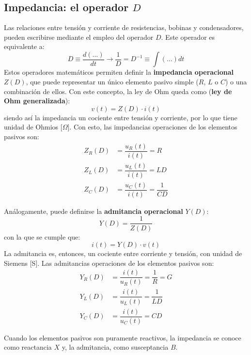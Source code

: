 \documentclass[11pt]{book} %
\begin{document}
		\subsection{Impedancia: el operador $D$ }\label{sec.operador_D}
	Las relaciones entre tensión y corriente de resistencias, bobinas y condensadores, pueden escribirse mediante el empleo del operador $D$. Este operador es equivalente a:
	\begin{equation*}
		D\equiv \dfrac{d(...)}{dt} \rightarrow \dfrac{1}{D}=D^{-1}\equiv \int (...) dt
	\end{equation*}
	Estos operadores matemáticos permiten definir la \textbf{impedancia operacional} $Z(D)$, que puede representar un único elemento pasivo simple ($R$, $L$ o $C$) o una combinación de ellos. Con este concepto, la ley de Ohm queda como (\textbf{ley de Ohm generalizada}):
	\begin{equation*}
		v(t)=Z(D)\cdot i(t)
	\end{equation*}
	siendo así la impedancia un cociente entre tensión y corriente, por lo que tiene unidad de Ohmios [$\Omega$].  Con esto, las impedancias operaciones de los elementos pasivos son: 
	\begin{align*}
		Z_R(D)&=\dfrac{u_R(t)}{i(t)}=R\\
		Z_L(D)&=\dfrac{u_L(t)}{i(t)}=LD\\
		Z_C(D)&=\dfrac{u_C(t)}{i(t)}=\dfrac{1}{CD}
	\end{align*}
	
	Análogamente, puede definirse la \textbf{admitancia operacional} $Y(D)$:
	\begin{equation*}
		Y(D)=\dfrac{1}{Z(D)}
	\end{equation*}
	con la que se cumple que:
	\begin{equation*}
		i(t)=Y(D)\cdot v(t)
	\end{equation*}
	La admitancia es, entonces, un cociente entre corriente y tensión, con unidad de Siemens [S]. Las admitancias operaciones de los elementos pasivos son: 
	\begin{align*}
		Y_R(D)&=\dfrac{i(t)}{u_R(t)}=\dfrac{1}{R}=G\\
		Y_L(D)&=\dfrac{i(t)}{u_L(t)}=\dfrac{1}{LD}\\
		Y_C(D)&=\dfrac{i(t)}{u_C(t)}=CD
	\end{align*} 
	
	\begin{remark}
		Cuando los elementos pasivos son puramente reactivos, la impedancia se conoce como reactancia $X$ y, la admitancia, como susceptancia $B$.
	\end{remark}
	
\end{document}
